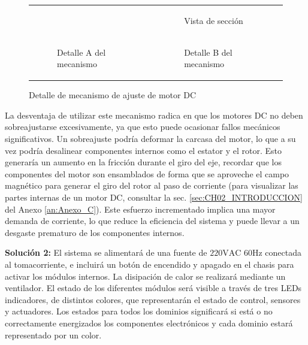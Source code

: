 \begin{figure}[!ht]
\begin{tabularx}{\linewidth}{*{2}{>{\centering\arraybackslash}X}}
\begin{subfigure}[t]{0.8\linewidth}
                \label{fig:imagen1}
            \end{subfigure}
            &
            \begin{subfigure}[t]{0.8\linewidth}
                \caption{Vista de sección}
                \label{fig:imagen2}
            \end{subfigure}
            \\
            \begin{subfigure}[t]{0.8\linewidth}
                \caption{Detalle A del mecanismo}
                \label{fig:imagen3}
            \end{subfigure}
            &
            \begin{subfigure}[t]{0.8\linewidth}
                \caption{Detalle B del mecanismo}
                \label{fig:imagen4}
            \end{subfigure}
        \end{tabularx}
        \caption{Detalle de mecanismo de ajuste de motor \ac{DC}}
        \label{fig:detalle1}
    \end{figure}
    
    La desventaja de utilizar este mecanismo radica en que los motores \ac{DC} no deben sobreajustarse excesivamente, ya que esto puede ocasionar fallos mecánicos significativos. Un sobreajuste podría deformar la carcasa del motor, lo que a su vez podría desalinear componentes internos como el estator y el rotor. Esto generaría un aumento en la fricción durante el giro del eje, recordar que los componentes del motor son ensamblados de forma que se aproveche el campo magnético para generar el giro del rotor al paso de corriente (para visualizar las partes internas de un motor \ac{DC}, consultar la sec. \ref{sec:CH02_INTRODUCCION} del Anexo \ref{an:Anexo_C}). Este esfuerzo incrementado implica una mayor demanda de corriente, lo que reduce la eficiencia del sistema y puede llevar a un desgaste prematuro de los componentes internos.


\textbf{Solución 2: }   
    El sistema se alimentará de una fuente de $220\text{VAC }60\text{Hz}$ conectada al tomacorriente, e incluirá un botón de encendido y apagado en el chasis para activar los módulos internos. La disipación de calor se realizará mediante un ventilador. El estado de los diferentes módulos será visible a través de tres LEDs indicadores, de distintos colores, que representarán el estado de control, sensores y actuadores. Los estados para todos los dominios significará si está o no correctamente energizados los componentes electrónicos y cada dominio estará representado por un color.
    	
